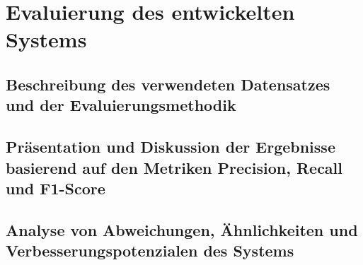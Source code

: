 \chapter{Evaluierung des entwickelten Systems}
\label{chap:evaluierung}

\section{Beschreibung des verwendeten Datensatzes und der Evaluierungsmethodik}

\section{Präsentation und Diskussion der Ergebnisse basierend auf den Metriken Precision, Recall und F1-Score}

\section{Analyse von Abweichungen, Ähnlichkeiten und Verbesserungspotenzialen des Systems}

\newpage